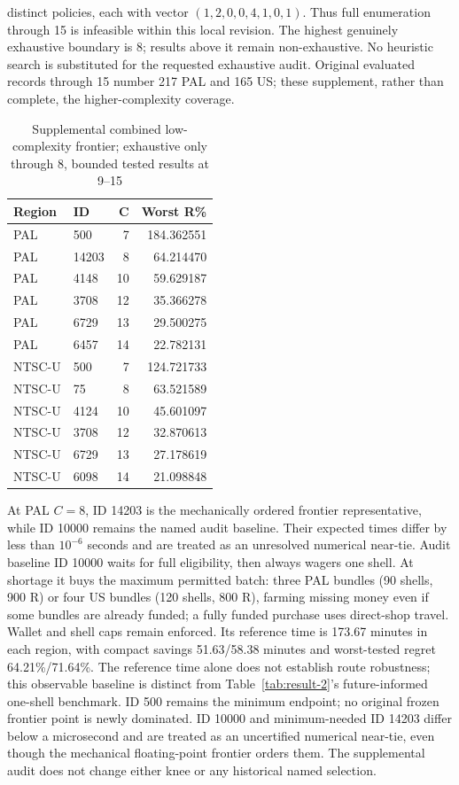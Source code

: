 \documentclass[11pt]{article}
\theoremstyle{definition}\newtheorem{definition}[theorem]{Definition}
\begin{document}
distinct policies, each with vector $(1,2,0,0,4,1,0,1)$. Thus full enumeration through 15 is infeasible within this local revision. The highest genuinely exhaustive boundary is 8; results above it remain non-exhaustive. No heuristic search is substituted for the requested exhaustive audit. Original evaluated records through 15 number 217 PAL and 165 US; these supplement, rather than complete, the higher-complexity coverage.
\begin{table}[H]\centering\small
\begin{tabular}{llrr}\toprule
Region & ID & C & Worst R\%\\\midrule
PAL & 500 & 7 & 184.362551\\
PAL & 14203 & 8 & 64.214470\\
PAL & 4148 & 10 & 59.629187\\
PAL & 3708 & 12 & 35.366278\\
PAL & 6729 & 13 & 29.500275\\
PAL & 6457 & 14 & 22.782131\\
NTSC-U & 500 & 7 & 124.721733\\
NTSC-U & 75 & 8 & 63.521589\\
NTSC-U & 4124 & 10 & 45.601097\\
NTSC-U & 3708 & 12 & 32.870613\\
NTSC-U & 6729 & 13 & 27.178619\\
NTSC-U & 6098 & 14 & 21.098848\\
\bottomrule\end{tabular}
\caption{Supplemental combined low-complexity frontier; exhaustive only through 8, bounded tested results at 9--15}\label{tab:low-frontier}\end{table}
At PAL $C=8$, ID 14203 is the mechanically ordered frontier representative, while ID 10000 remains the named audit baseline. Their expected times differ by less than $10^{-6}$ seconds and are treated as an unresolved numerical near-tie.
Audit baseline ID 10000 waits for full eligibility, then always wagers one shell. At shortage it buys the maximum permitted batch: three PAL bundles (90 shells, 900 R) or four US bundles (120 shells, 800 R), farming missing money even if some bundles are already funded; a fully funded purchase uses direct-shop travel. Wallet and shell caps remain enforced. Its reference time is 173.67 minutes in each region, with compact savings 51.63/58.38 minutes and worst-tested regret 64.21\%/71.64\%. The reference time alone does not establish route robustness; this observable baseline is distinct from Table~\ref{tab:result-2}'s future-informed one-shell benchmark.
ID 500 remains the minimum endpoint; no original frozen frontier point is newly dominated. ID 10000 and minimum-needed ID 14203 differ below a microsecond and are treated as an uncertified numerical near-tie, even though the mechanical floating-point frontier orders them. The supplemental audit does not change either knee or any historical named selection.
\end{document}
